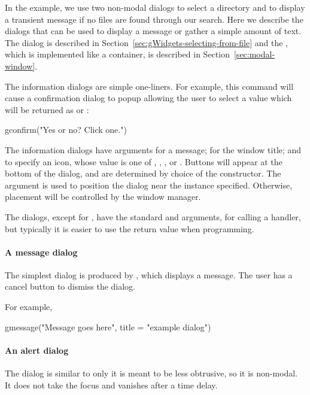 In the example, we use two non-modal dialogs  to
select a directory and  to display a transient message if
no files are found through our search.  Here we describe the dialogs
that can be used to display a message or gather a simple amount of
text. The  dialog is described in
Section~\ref{sec:gWidgets-selecting-from-file} and the
, which is implemented like a container, is
described in Section~\ref{sec:modal-window}.


The information dialogs are simple one-liners. For example, this
command will cause a confirmation dialog to popup allowing the user to
select a value which will be returned as  or :
\begin{Schunk}
\begin{Sinput}
 gconfirm("Yes or no? Click one.")
\end{Sinput}
\end{Schunk}


The information dialogs have arguments 
for a message;  for the window title; and
 to specify an icon, whose value is one of
, , , or
. Buttons will appear at the bottom of the dialog, and
are determined by choice of the constructor. The
 argument is used to position the dialog
near the  instance specified. Otherwise, placement will
be controlled by the window manager.

The dialogs, except for , have the standard
 and  arguments, for calling a handler, but
typically it is easier to use the return value when programming.

\paragraph{A message dialog}
The simplest dialog is produced by , which
displays a message. The user has a cancel button to dismiss the dialog.


For example,
\begin{Schunk}
\begin{Sinput}
 gmessage("Message goes here", title = "example dialog")
\end{Sinput}
\end{Schunk}


\paragraph{An alert dialog}
The  dialog is similar to  only it is
meant to be less obtrusive, so it is non-modal. It does not take the
focus and vanishes after a time delay.

